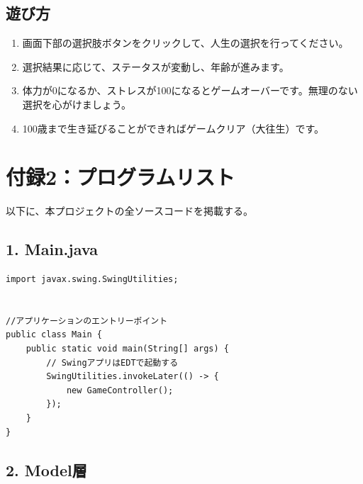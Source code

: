 \documentclass[a4paper,11pt]{jsarticle}
\begin{document}
\subsection*{遊び方}
\begin{enumerate}
    \item 画面下部の選択肢ボタンをクリックして、人生の選択を行ってください。
    \item 選択結果に応じて、ステータスが変動し、年齢が進みます。
    \item 体力が0になるか、ストレスが100になるとゲームオーバーです。無理のない選択を心がけましょう。
    \item 100歳まで生き延びることができればゲームクリア（大往生）です。
\end{enumerate}



\section{付録2：プログラムリスト}
以下に、本プロジェクトの全ソースコードを掲載する。

\subsection*{1. Main.java}
\begin{lstlisting}[caption=Main.java]
import javax.swing.SwingUtilities;


//アプリケーションのエントリーポイント
public class Main {
    public static void main(String[] args) {
        // SwingアプリはEDTで起動する
        SwingUtilities.invokeLater(() -> {
            new GameController();
        });
    }
}
\end{lstlisting}

\subsection*{2. Model層}
\end{document}
